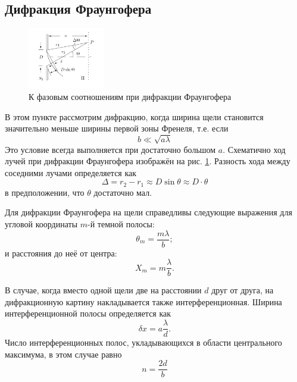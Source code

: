 \documentclass[a4paper,12pt]{article} %
\begin{document}
\subsection*{Дифракция Фраунгофера}
\begin{figure}
  \begin{center}
    \includegraphics[width = 0.3\textwidth]{3.png}
  \end{center}
  \caption{К фазовым соотношениям при дифракции Фраунгофера}
  \label{FHDiff}
\end{figure}
В этом пункте рассмотрим дифракцию, когда ширина щели становится значительно меньше ширины первой зоны Френеля, т.е. если 
\begin{equation}
    b \ll\sqrt{a \lambda} 
\end{equation}	
Это условие всегда выполняется при достаточно большом $a$. Схематично ход лучей при дифракции Фраунгофера изображён на рис. \ref{FHDiff}. Разность хода между соседними лучами определяется как 
\begin{equation}
\Delta = r_2 - r_1 \approx D \sin \theta \approx D \cdot \theta
\end{equation}
в предположении, что $\theta$ достаточно мал.

Для дифракции Фраунгофера на щели справедливы следующие выражения для угловой координаты $m$-й темной полосы:
\begin{equation}
\theta_m = \frac{m \lambda}{b};
\end{equation}
и расстояния до неё от центра: 
\begin{equation}
X_m = m\frac{\lambda}{b}.
\end{equation}

В случае, когда вместо одной щели две на расстоянии $d$ друг от друга, на дифракционную картину накладывается также интерференционная. Ширина интерференционной полосы определяется как
\begin{equation}
    \delta x = a\frac{\lambda}{d}.
\end{equation}
Число интерференционных полос, укладывающихся в области центрального максимума, в этом случае равно
\begin{equation}
n = \frac{2d}{b}
\end{equation}
\end{document}
